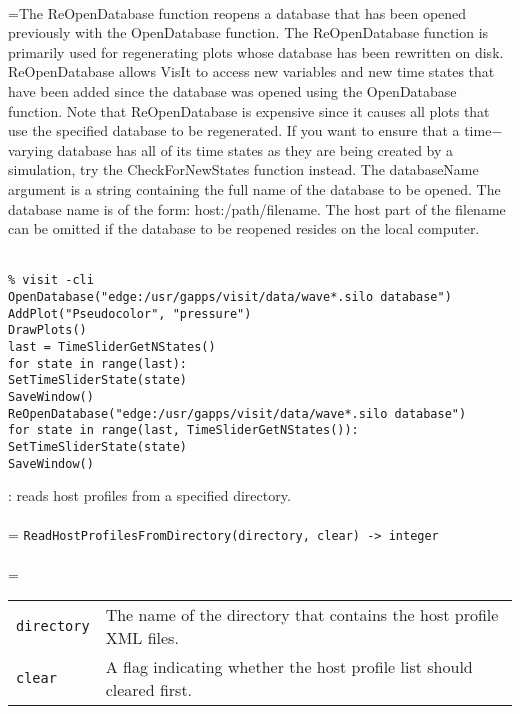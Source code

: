 \documentclass[10pt,a4paper]{report}
\begin{document}
 \\ 
\hangindent=\parindent The ReOpenDatabase function reopens a database that has been opened previously with the OpenDatabase function. The ReOpenDatabase function is primarily used for regenerating plots whose database has been rewritten on disk. ReOpenDatabase allows VisIt to access new variables and new time states that have been added since the database was opened using the OpenDatabase function. Note that ReOpenDatabase is expensive since it causes all plots that use the specified database to be regenerated. If you want to ensure that a time$-$varying database has all of its time states as they are being created by a simulation, try the CheckForNewStates function instead. The databaseName argument is a string containing the full name of the database to be opened. The database name is of the form: host:/path/filename. The host part of the filename can be omitted if the database to be reopened resides on the local computer. \\[-3mm] 

\\[-6mm]
\begin{verbatim}% visit -cli
OpenDatabase("edge:/usr/gapps/visit/data/wave*.silo database")
AddPlot("Pseudocolor", "pressure")
DrawPlots()
last = TimeSliderGetNStates()
for state in range(last):
SetTimeSliderState(state)
SaveWindow()
ReOpenDatabase("edge:/usr/gapps/visit/data/wave*.silo database")
for state in range(last, TimeSliderGetNStates()):
SetTimeSliderState(state)
SaveWindow()
\end{verbatim}
\newpage


{}
: reads host profiles from a specified directory.\\[-3mm]

 \\ 
\hangindent=\parindent 
\verb!ReadHostProfilesFromDirectory(directory, clear) -> integer!\\ [-3mm]

 \\ 
\hangindent=\parindent 
\begin{tabular}{lp{9cm}}
\verb!directory! & The name of the directory that contains the host profile XML files. \\
\verb!clear! & A flag indicating whether the host profile list should cleared first. \\
\end{tabular} \\[-2mm]
\end{document}
